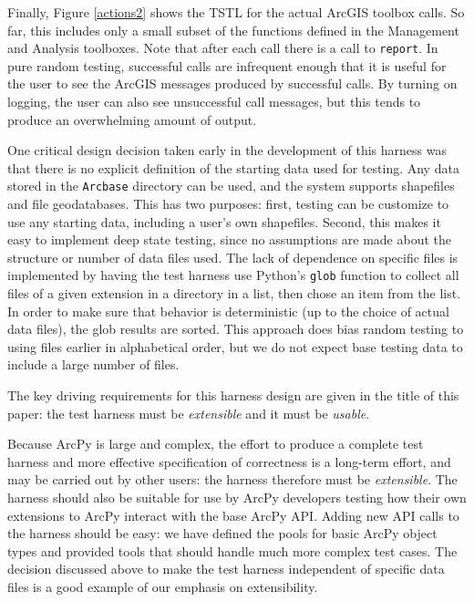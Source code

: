 Finally, Figure \ref{actions2} shows the TSTL for the actual
ArcGIS toolbox calls.  So far, this includes only a small subset of
the functions defined in the Management and Analysis toolboxes.  Note
that after each call there is a call to {\tt report}.  In pure random
testing, successful calls are infrequent enough that it is useful
for the user to see the ArcGIS messages produced by successful calls.
By turning on logging, the user can also see unsuccessful call
messages, but this tends to produce an overwhelming amount of output.

One critical design decision taken early in the development of this
harness was that there is no explicit definition of the starting data
used for testing.  Any data stored in the {\tt Arcbase} directory can
be used, and the system supports shapefiles and file geodatabases.
This has two purposes:  first, testing can be customize to use any
starting data, including a user's own shapefiles.  Second, this makes
it easy to implement deep state testing, since no assumptions are made
about the structure or number of data files used.  The lack of
dependence on specific files is implemented by having the test harness
use Python's {\tt glob} function to collect all files of a given
extension in a directory in a list, then chose an item from the list.
In order to make sure that behavior is deterministic (up to the choice
of actual data files), the glob results are sorted.  This approach
does bias random testing to using files earlier in alphabetical order,
but we do not expect base testing data to include a large number of
files.

The key driving requirements for this harness design are given in the
title of this paper:  the test harness must be \emph{extensible} and
it must be \emph{usable}.

Because ArcPy is large and complex, the effort to produce a
complete test harness and more effective specification of correctness
is a long-term effort, and may be carried out by other users:  the
harness therefore must be \emph{extensible}.  The
harness should also be suitable for use by ArcPy developers testing
how their own extensions to ArcPy interact with the base ArcPy API.
Adding new API calls to the harness should be easy:  we have defined
the pools for basic ArcPy object types and provided tools that should
handle much more complex test cases.  The decision discussed above to
make the test harness independent of specific data files is a good
example of our emphasis on extensibility.


